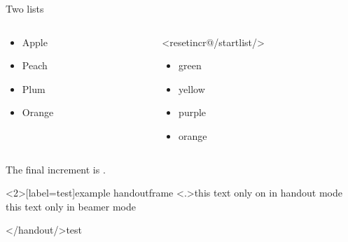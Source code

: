 \documentclass[\jobname]{beamer} %
\begin{document}
\begin{examp}
  \resetincr
  \begin{center}
    Two lists \\
  \end{center}
  \begin{columns}
    \begin{column}{.2\textwidth}
      \begin{itemize}[<+-| alert@+>]
      \item Apple \item Peach  \item Plum \item Orange
      \end{itemize}
    \end{column}
    \begin{column}{.2\textwidth}
      \action<resetincr@/startlist/>{}
      \begin{itemize}[<+-| alert@+>]
      \item green \item yellow \item purple \item orange
      \end{itemize}
    \end{column}
  \end{columns}
  \vfill
  \onslide<+->
  The final increment is . 
\end{examp}



\begin{examp}
  \resetincr[2]
\end{examp}

\begin{frame}<2>[label=test]{example handoutframe}
  \resetincr
  \only<.>{this text only on in handout mode\\}
  \onslide<+->
  this text only in beamer mode\\
\end{frame}

</handout/>{test}
\end{document}

